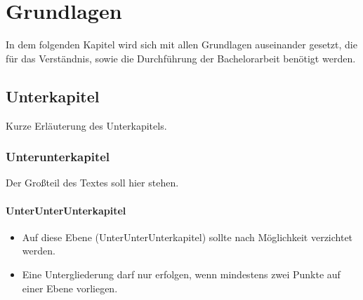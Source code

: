 \chapter{Grundlagen}
\label{cha:Grundlagen}

In dem folgenden Kapitel wird sich mit allen Grundlagen auseinander gesetzt, die f\"ur das Verst\"andnis, sowie die Durchf\"uhrung der Bachelorarbeit ben\"otigt werden.

\section{Unterkapitel}

Kurze Erl\"auterung des Unterkapitels.

\subsection{Unterunterkapitel}

Der Gro{\ss}teil des Textes soll hier stehen.

\subsubsection{UnterUnterUnterkapitel}

\begin{itemize}
    \item Auf diese Ebene (UnterUnterUnterkapitel) sollte nach M\"oglichkeit verzichtet werden.
    \item Eine Untergliederung darf nur erfolgen, wenn mindestens zwei Punkte auf einer Ebene vorliegen.
\end{itemize}
